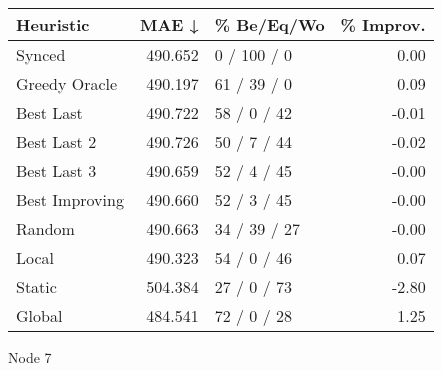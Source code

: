 \begin{tabular}{lrlr}
\toprule
\textbf{Heuristic} & \textbf{MAE ↓} & \textbf{\% Be/Eq/Wo} & \textbf{\% Improv.} \\
\midrule
            Synced &        490.652 &          0 / 100 / 0 &                0.00 \\
     Greedy Oracle &        490.197 &          61 / 39 / 0 &                0.09 \\
         Best Last &        490.722 &          58 / 0 / 42 &               -0.01 \\
       Best Last 2 &        490.726 &          50 / 7 / 44 &               -0.02 \\
       Best Last 3 &        490.659 &          52 / 4 / 45 &               -0.00 \\
    Best Improving &        490.660 &          52 / 3 / 45 &               -0.00 \\
            Random &        490.663 &         34 / 39 / 27 &               -0.00 \\
             Local &        490.323 &          54 / 0 / 46 &                0.07 \\
            Static &        504.384 &          27 / 0 / 73 &               -2.80 \\
            Global &        484.541 &          72 / 0 / 28 &                1.25 \\
\bottomrule
\end{tabular}
\caption{Node 7}
\label{tab:non_lr01_le1_bs4_7}
